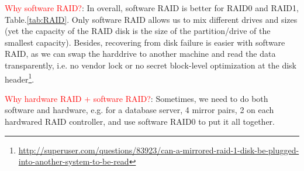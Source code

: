 \textcolor{red}{Why software RAID?}: 
In overall, software RAID is better for RAID0 and RAID1, Table.\ref{tab:RAID}.
Only software RAID allows us to mix different drives and sizes (yet the capacity
of the RAID disk is the size of the partition/drive of the smallest capacity).
Besides, recovering from disk failure is easier with software RAID, as we
can swap the harddrive to another machine and read the data transparently, i.e. no vendor
lock or no secret block-level optimization at the disk
header\footnote{\url{http://superuser.com/questions/83923/can-a-mirrored-raid-1-disk-be-plugged-into-another-system-to-be-read}}.


\textcolor{red}{Why hardware RAID + software RAID?}: Sometimes, we need to do
both software and hardware, e.g. for a database server, 4 mirror pairs, 2 on
each hardwared RAID controller, and use software RAID0 to put it all together.

